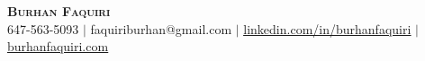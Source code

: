 \begin{center}
    \textbf{\LARGE \scshape Burhan Faquiri} \\ \vspace{0pt}
    \small 647-563-5093 $|$ {faquiriburhan@gmail.com} $|$ 
    \href{https://www.linkedin.com/in/burhanfaquiri}{\underline{linkedin.com/in/burhanfaquiri}} $|$ 
    \href{https://www.burhanfaquiri.com}{\underline{burhanfaquiri.com}}
\end{center}
